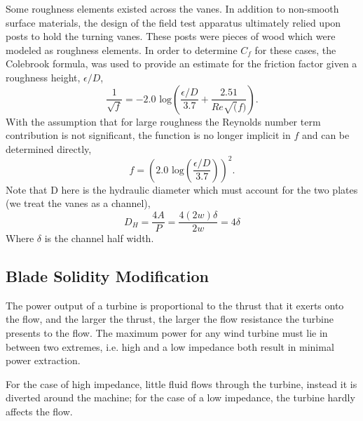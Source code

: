 Some roughness elements existed across the vanes. In addition to
non-smooth surface materials, the design of the field test apparatus
ultimately relied upon posts to hold the turning vanes. These posts were
pieces of wood which were modeled as roughness elements. In order to
determine $C_f$ for these cases, the Colebrook formula\cite{Colebrook367},
was used to provide an estimate for the friction factor given a
roughness height, $\epsilon/D$,  
\begin{equation}
 \frac{1}{\sqrt{f}} = -2.0 \text{ log}\left(\frac{\epsilon/D}{3.7} + \frac{2.51}{Re\sqrt(f)}\right).
\end{equation}
 With the assumption that for large roughness the Reynolds number term
 contribution is not significant, the function is no longer implicit in
 $f$ and can be determined directly, 
\begin{equation}
 f = \left(2.0 \text{ log}\left(\frac{\epsilon/D}{3.7}\right)\right)^2. 
\end{equation}
Note that D here is the hydraulic diameter which must account for the
two plates (we treat the vanes as a channel),
\begin{equation}
D_H = \frac{4 A}{P} = \frac{4 (2w)\delta}{2w} = 4 \delta
\end{equation}
Where $\delta$ is the channel half width.



\subsection{Blade Solidity Modification}
\label{sec:solidity}
%
%

The power output of a turbine is proportional to the thrust that it
exerts onto the flow, and the larger the thrust, the larger the flow
resistance the turbine presents to the flow. The maximum power for any
wind turbine must lie in between two extremes, i.e. high and
a low impedance both result in minimal power
extraction\cite{solidity_oxford}.  

For the case of high impedance, little fluid flows through the
turbine, instead it is diverted around the machine; for the case of a
low impedance, the turbine hardly affects the flow. 

